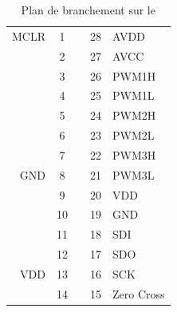 \begin{table}[h]
\begin{multicols}{2}
\begin{center}
			
			\begin{footnotesize}
				\begin{tabular}{r|ccc|l}
				MCLR 	& 1 &    & 28 & AVDD 	\\ 
				  		& 2 &    & 27 & AVCC 	\\ 
				  		& 3 &    & 26 & PWM1H	\\
				  		& 4 &    & 25 & PWM1L	\\ 
				  		& 5 &    & 24 & PWM2H	\\ 
				  		& 6 &    & 23 & PWM2L  	\\ 
				 		& 7 &    & 22 & PWM3H  	\\ 
				GND 	& 8 &    & 21 & PWM3L  	\\ 
				  		& 9 &    & 20 & VDD 	\\ 
				  		& 10 &   & 19 & GND 	\\ 
				  		& 11 &   & 18 & SDI 	\\ 
				  		& 12 &   & 17 & SDO 	\\ 
				VDD 	& 13 &   & 16 & SCK 	\\ 
				  		& 14 &   & 15 & Zero Cross\\ 
				\end{tabular} 
			\end{footnotesize}
			\caption{Plan de branchement sur le \dspic}
			\label{pinoutdspic}
			\end{center}
			\end{multicols}
		\end{table}

